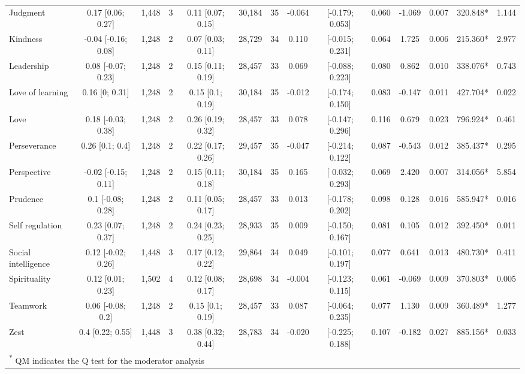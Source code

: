 \documentclass[
  man,floatsintext]{apa6}
\begin{document}
\begin{table}
{\begin{tabular}[t]{lccccccccccccc}
Judgment & 0.17 [0.06; 0.27] & 1,448 & 3 & 0.11 [0.07; 0.15] & 30,184 & 35 & -0.064 & {}[-0.179; 0.053] & 0.060 & -1.069 & 0.007 & 320.848* & 1.144\\
Kindness & -0.04 [-0.16; 0.08] & 1,248 & 2 & 0.07 [0.03; 0.11] & 28,729 & 34 & 0.110 & {}[-0.015; 0.231] & 0.064 & 1.725 & 0.006 & 215.360* & 2.977\\
Leadership & 0.08 [-0.07; 0.23] & 1,248 & 2 & 0.15 [0.11; 0.19] & 28,457 & 33 & 0.069 & {}[-0.088; 0.223] & 0.080 & 0.862 & 0.010 & 338.076* & 0.743\\
Love of learning & 0.16 [0; 0.31] & 1,248 & 2 & 0.15 [0.1; 0.19] & 30,184 & 35 & -0.012 & {}[-0.174; 0.150] & 0.083 & -0.147 & 0.011 & 427.704* & 0.022\\
\addlinespace
Love & 0.18 [-0.03; 0.38] & 1,248 & 2 & 0.26 [0.19; 0.32] & 28,457 & 33 & 0.078 & {}[-0.147; 0.296] & 0.116 & 0.679 & 0.023 & 796.924* & 0.461\\
Perseverance & 0.26 [0.1; 0.4] & 1,248 & 2 & 0.22 [0.17; 0.26] & 29,457 & 35 & -0.047 & {}[-0.214; 0.122] & 0.087 & -0.543 & 0.012 & 385.437* & 0.295\\
Perspective & -0.02 [-0.15; 0.11] & 1,248 & 2 & 0.15 [0.11; 0.18] & 30,184 & 35 & 0.165 & {}[ 0.032; 0.293] & 0.069 & 2.420 & 0.007 & 314.056* & 5.854\\
Prudence & 0.1 [-0.08; 0.28] & 1,248 & 2 & 0.11 [0.05; 0.17] & 28,457 & 33 & 0.013 & {}[-0.178; 0.202] & 0.098 & 0.128 & 0.016 & 585.947* & 0.016\\
Self regulation & 0.23 [0.07; 0.37] & 1,248 & 2 & 0.24 [0.23; 0.25] & 28,933 & 35 & 0.009 & {}[-0.150; 0.167] & 0.081 & 0.105 & 0.012 & 392.450* & 0.011\\
\addlinespace
Social intelligence & 0.12 [-0.02; 0.26] & 1,448 & 3 & 0.17 [0.12; 0.22] & 29,864 & 34 & 0.049 & {}[-0.101; 0.197] & 0.077 & 0.641 & 0.013 & 480.730* & 0.411\\
Spirituality & 0.12 [0.01; 0.23] & 1,502 & 4 & 0.12 [0.08; 0.17] & 28,698 & 34 & -0.004 & {}[-0.123; 0.115] & 0.061 & -0.069 & 0.009 & 370.803* & 0.005\\
Teamwork & 0.06 [-0.08; 0.2] & 1,248 & 2 & 0.15 [0.1; 0.19] & 28,457 & 33 & 0.087 & {}[-0.064; 0.235] & 0.077 & 1.130 & 0.009 & 360.489* & 1.277\\
Zest & 0.4 [0.22; 0.55] & 1,448 & 3 & 0.38 [0.32; 0.44] & 28,783 & 34 & -0.020 & {}[-0.225; 0.188] & 0.107 & -0.182 & 0.027 & 885.156* & 0.033\\
\bottomrule
\multicolumn{14}{l}{\textsuperscript{*} QM indicates the Q test for the moderator analysis}\\
\end{tabular}}
\end{table}
\end{document}

